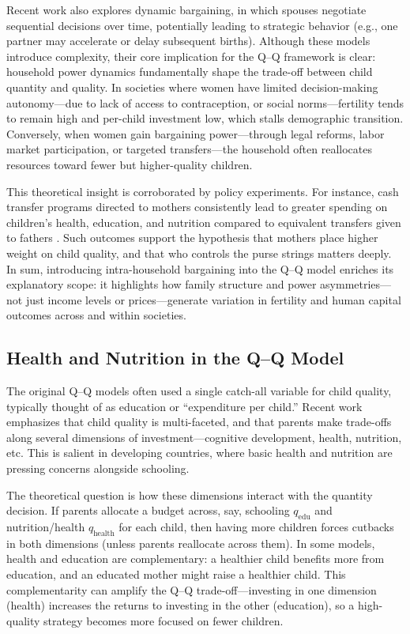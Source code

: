 \documentclass[]{AEA}
\begin{document}
Recent work also explores dynamic bargaining, in which spouses negotiate
sequential decisions over time, potentially leading to strategic
behavior (e.g., one partner may accelerate or delay subsequent births).
Although these models introduce complexity, their core implication for
the Q--Q framework is clear: household power dynamics fundamentally
shape the trade-off between child quantity and quality. In societies
where women have limited decision-making autonomy---due to lack of
access to contraception, or social norms---fertility tends to remain
high and per-child investment low, which stalls demographic transition.
Conversely, when women gain bargaining power---through legal reforms,
labor market participation, or targeted transfers---the household often
reallocates resources toward fewer but higher-quality children.

This theoretical insight is corroborated by policy experiments. For
instance, cash transfer programs directed to mothers consistently lead
to greater spending on children's health, education, and nutrition
compared to equivalent transfers given to fathers
\citep{duflo2003grandmothers, thomas1990intra} . Such outcomes support
the hypothesis that mothers place higher weight on child quality, and
that who controls the purse strings matters deeply. In sum, introducing
intra-household bargaining into the Q--Q model enriches its explanatory
scope: it highlights how family structure and power asymmetries---not
just income levels or prices---generate variation in fertility and human
capital outcomes across and within societies.

\subsection{Health and Nutrition in the Q–Q Model}

The original Q--Q models often used a single catch-all variable for
child quality, typically thought of as education or ``expenditure per
child.'' Recent work emphasizes that child quality is multi-faceted, and
that parents make trade-offs along several dimensions of
investment---cognitive development, health, nutrition, etc. This is
salient in developing countries, where basic health and nutrition are
pressing concerns alongside schooling.

The theoretical question is how these dimensions interact with the
quantity decision. If parents allocate a budget across, say, schooling
\(q_{\text{edu}}\) and nutrition/health \(q_{\text{health}}\) for each
child, then having more children forces cutbacks in both dimensions
(unless parents reallocate across them). In some models, health and
education are complementary: a healthier child benefits more from
education, and an educated mother might raise a healthier child. This
complementarity can amplify the Q--Q trade-off---investing in one
dimension (health) increases the returns to investing in the other
(education), so a high-quality strategy becomes more focused on fewer
children.
\end{document}

